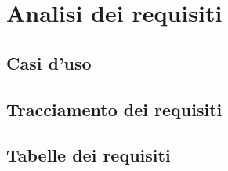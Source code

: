 \chapter{Analisi dei requisiti}
\label{chap:analisi-requisiti}

\section{Casi d'uso}

\section{Tracciamento dei requisiti}

\section{Tabelle dei requisiti}

\newpage